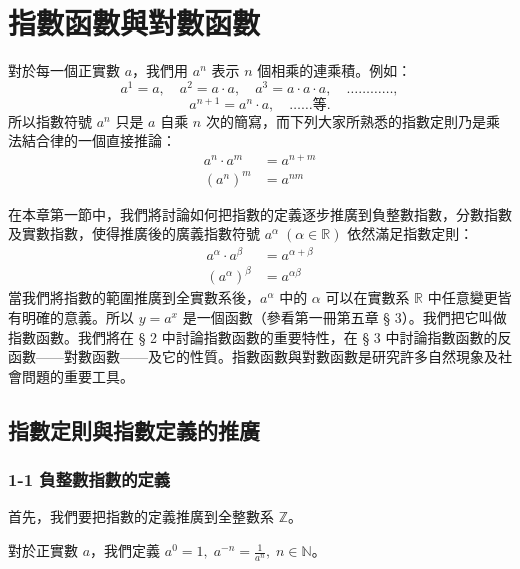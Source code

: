 
\section{指數函數與對數函數}\label{sec:b2_ch4}

對於每一個正實數 $a$，我們用 $a^n$ 表示 $n$ 個相乘的連乘積。例如：
\[
a^1 = a,\quad a^2 = a\cdot a,\quad a^3 = a\cdot a\cdot a,\quad \dots\dots\dots\dots,
\]
\[
a^{n+1} = a^n \cdot a,\quad \dots\dots \text{等}.
\]
所以指數符號 $a^n$ 只是 $a$ 自乘 $n$ 次的簡寫，而下列大家所熟悉的指數定則乃是乘法結合律的一個直接推論：
\begin{align}
a^n \cdot a^m &= a^{n+m} \label{eq:b2-ch4-intro-exp-rule-1} \\
(a^n)^m &= a^{nm} \label{eq:b2-ch4-intro-exp-rule-2}
\end{align}

在本章第一節中，我們將討論如何把指數的定義逐步推廣到負整數指數，分數指數及實數指數，使得推廣後的廣義指數符號 $a^\alpha\; (\alpha \in \mathbb{R})$ 依然滿足指數定則：
\begin{align}
a^\alpha \cdot a^\beta &= a^{\alpha+\beta} \label{eq:b2-ch4-intro-gen-rule-1} \\
(a^\alpha)^\beta &= a^{\alpha\beta} \label{eq:b2-ch4-intro-gen-rule-2}
\end{align}
當我們將指數的範圍推廣到全實數系後，$a^\alpha$ 中的 $\alpha$ 可以在實數系 $\mathbb{R}$ 中任意變更皆有明確的意義。所以 $y = a^x$ 是一個函數（參看第一冊第五章 § 3）。我們把它叫做指數函數。我們將在 § 2 中討論指數函數的重要特性，在 § 3 中討論指數函數的反函數——對數函數——及它的性質。指數函數與對數函數是研究許多自然現象及社會問題的重要工具。

\subsection{指數定則與指數定義的推廣}\label{sec:b2_4-1}

\subsubsection*{1-1 負整數指數的定義}

首先，我們要把指數的定義推廣到全整數系 $\mathbb{Z}$。

\begin{definition*}
對於正實數 $a$，我們定義 $a^0 = 1,\; a^{-n} = \frac{1}{a^n},\; n \in \mathbb{N}$。
\end{definition*}
